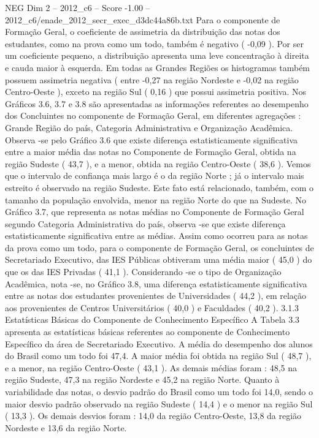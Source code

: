 \begin{textsample}{NEG Dim 2 – 2012\_c6 – Score -1.00 – 2012\_c6/enade\_2012\_secr\_exec\_d3dc44a86b.txt}
Para o componente de Formação Geral, o coeficiente de assimetria da distribuição das notas dos estudantes, como na prova como um todo, também é negativo ( -0,09 ).
Por ser um coeficiente pequeno, a distribuição apresenta uma leve concentração à direita e cauda maior à esquerda.
Em todas as Grandes Regiões os histogramas também possuem assimetria negativa ( entre -0,27 na região Nordeste e -0,02 na região Centro-Oeste ), exceto na região Sul ( 0,16 ) que possui assimetria positiva.
Nos Gráficos 3.6, 3.7 e 3.8 são apresentadas as informações referentes ao desempenho dos Concluintes no componente de Formação Geral, em diferentes agregações : Grande Região do país, Categoria Administrativa e Organização Acadêmica.
Observa -se pelo Gráfico 3.6 que existe diferença estatisticamente significativa entre a maior média das notas no Componente de Formação Geral, obtida na região Sudeste ( 43,7 ), e a menor, obtida na região Centro-Oeste ( 38,6 ).
Vemos que o intervalo de confiança mais largo é o da região Norte ; já o intervalo mais estreito é observado na região Sudeste.
Este fato está relacionado, também, com o tamanho da população envolvida, menor na região Norte do que na Sudeste.
No Gráfico 3.7, que representa as notas médias no Componente de Formação Geral segundo Categoria Administrativa do país, observa -se que existe diferença estatisticamente significativa entre as médias.
Assim como ocorreu para as notas da prova como um todo, para o componente de Formação Geral, os concluintes de Secretariado Executivo, das IES Públicas obtiveram uma média maior ( 45,0 ) do que os das IES Privadas ( 41,1 ).
Considerando -se o tipo de Organização Acadêmica, nota -se, no Gráfico 3.8, uma diferença estatisticamente significativa entre as notas dos estudantes provenientes de Universidades ( 44,2 ), em relação aos provenientes de Centros Universitários ( 40,0 ) e Faculdades ( 40,2 ). 3.1.3 Estatísticas Básicas do Componente de Conhecimento Específico A Tabela 3.3 apresenta as estatísticas básicas referentes ao componente de Conhecimento Específico da área de Secretariado Executivo.
A média do desempenho dos alunos do Brasil como um todo foi 47,4.
A maior média foi obtida na região Sul ( 48,7 ), e a menor, na região Centro-Oeste ( 43,1 ).
As demais médias foram : 48,5 na região Sudeste, 47,3 na região Nordeste e 45,2 na região Norte.
Quanto à variabilidade das notas, o desvio padrão do Brasil como um todo foi 14,0, sendo o maior desvio padrão observado na região Sudeste ( 14,4 ) e o menor na região Sul ( 13,3 ).
Os demais desvios foram : 14,0 da região Centro-Oeste, 13,8 da região Nordeste e 13,6 da região Norte.

\end{textsample}

